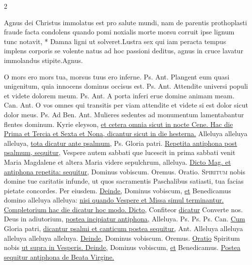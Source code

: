 \begin{multicols*}{2}
\begin{responsory}
{Agnus dei Christus immolatus est pro salute mundi, nam de parentis prothoplasti fraude facta condolens quando pomi noxialis morte morsu corruit ipse lignum tunc notavit, * Damna ligni ut solveret.}{Lustra sex qui iam peracta tempus implens corporis se volente natus ad hoc passioni deditus, agnus in cruce lavatur immolandus stipite.}Agnus.
\end{responsory}%
 O mors ero mors tua, morsus tuus ero inferne. {\color{Red} Ps.}  {\color{Red} Ant.} Plangent eum quasi unigenitum, quia innocens dominus occisus est. {\color{Red} Ps.}  {\color{Red} Ant.} Attendite universi populi et videte dolorem meum. {\color{Red} Ps.}  {\color{Red} Ant.} A porta inferi erue domine animam meam. {\color{Red} Can.}  {\color{Red} Ant.} O vos omnes qui transitis per viam attendite et videte si est dolor sicut dolor meus. {\color{Red} Ps.}  {\color{Red} Ad Ben. Ant.} Mulieres sedentes ad monumentum lamentabantur flentes dominum.
\newline Kyrie eleyson, \ul{et cetera omnia sicut in nocte Cene. Hac die Prima et Tercia et Sexta et Nona, dicantur sicut in die hesterna.}
 Alleluya alleluya alleluya, \ul{tota dicatur ante psalmum,} {\color{Red} Ps.}  Gloria patri. \ul{Repetita antiphona post psalmum, sequitur,}
 Vespere autem sabbati que lucescit in prima sabbati venit Maria Magdalene et altera Maria videre sepulchrum, alleluya. \ul{Dicto Mag. et antiphona repetita: sequitur,} Dominus vobiscum. Oremus. {\color{Red} Oratio.}
\lettrine[lines=2]{\zallmancaps \color{Blue} S}{piritum} \hypertarget{spiritum-nobis}{\label{spiritum-nobis}} nobis domine tue caritatis infunde, ut quos sacramentis Paschalibus satiasti, tua facias pietate concordes. Per eiusdem. \ul{Deinde,} Dominus vobiscum, \ul{et} Benedicamus domino alleluya alleluya: \ul{nisi quando Vespere et Missa simul terminantur.}
\newline \ul{Completorium hac die dicatur hoc modo. Dicto,} Confiteor \ul{dicatur} Converte nos. Deus in adiutorium, \ul{postea incipiatur antiphona,} Alleluya. {\color{Red} Ps.}  {\color{Red} Ps.}  {\color{Red} Ps.}  {\color{Red} Can.}  \ul{Cum} Gloria patri, \ul{dicantur psalmi et canticum postea sequitur,} {\color{Red} Ant.} Alleluya alleluya alleluya alleluya alleluya. \ul{Deinde,} Dominus vobiscum. Oremus. \ul{Oratio} Spiritum nobis \ul{ut supra in Vesperis. Deinde,} Dominus vobiscum, \ul{et} Benedicamus. \ul{Postea sequitur antiphona de Beata Virgine.}

\end{multicols*}
